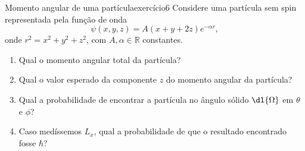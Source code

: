\begin{exercício}{Momento angular de uma partícula}{exercício6}
    Considere uma partícula sem spin representada pela função de onda
    \begin{equation*}
        \psi(x,y,z) = A(x + y + 2z) e^{-\alpha r},
    \end{equation*}
    onde \(r^2 = x^2 + y^2 + z^2\), com \(A, \alpha \in \mathbb{R}\) constantes.
    \begin{enumerate}[label=(\alph*)]
        \item Qual o momento angular total da partícula?
        \item Qual o valor esperado da componente \(z\) do momento angular da partícula?
        \item Qual a probabilidade de encontrar a partícula no ângulo sólido \(\dl{\Omega}\) em \(\theta\) e \(\phi\)?
        \item Caso medíssemos \(L_x\), qual a probabilidade de que o resultado encontrado fosse \(\hbar\)?
    \end{enumerate}
\end{exercício}
